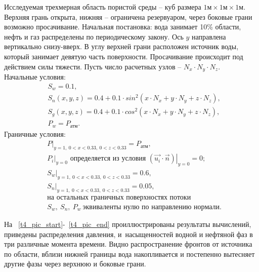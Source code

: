 Исследуемая трехмерная область пористой среды -- куб размера
$\text{1м} \times \text{1м} \times \text{1м}$.
Верхняя грань открыта, нижняя -- ограничена резервуаром, через боковые грани
возможно просачивание.
Начальная постановка: вода занимает 10\% области,
нефть и газ распределены по периодическому закону. Ось $y$ направлена вертикально снизу-вверх.
В углу верхней грани расположен источник воды, который занимает девятую часть поверхности. Просачивание происходит под действием силы тяжести. 
Пусть число расчетных узлов -- $N_x\cdot N_y\cdot N_z$.\\
Начальные условия:
\begin{equation}
  \begin{aligned}
    &S_w=0.1,\\
    &S_n(x, y, z)=0.4 + 0.1 \cdot sin^2(x \cdot N_x + y \cdot N_y + z \cdot N_z),\\
    &S_g(x, y, z)=0.4 + 0.1 \cdot cos^2(x \cdot N_x + y \cdot N_y + z \cdot N_z),\\
    &P_w=P_\text{атм}.
   \end{aligned}
\end{equation}
Граничные условия:
\begin{equation}
  \begin{aligned}
    &\left.P\right|_{y=1,\ 0 < x < 0.33,\ 0 < z < 0.33}=P_{\text{атм}},\\
    &\left.{P_i}\right|_{y=0}\text{ определяется из условия } \left.(\overrightarrow{u_i} \cdot \overrightarrow{n})\right|_{y=0}=0;\\
    &\left.S_w\right|_{y=1,\ 0 < x < 0.33,\ 0 < z < 0.33}=0.6,\\
    &\left.S_n\right|_{y=1,\ 0 < x < 0.33,\ 0 < z < 0.33}=0.05,\\
    &\text{на остальных граничных поверхностях потоки}\\
    &S_w,\ S_n,\ P_w\ \text{эквиваленты нулю по направлению нормали.}
  \end{aligned}
\end{equation}

На ~\ref{t4_pic_start}-~\ref{t4_pic_end} проиллюстрированы результаты вычислений, приведены распределения давления,
и~насыщенностей водной и нефтяной фаз в три различные момента времени. Видно распространение фронтов от источника по области, вблизи нижней границы вода накопливается и постепенно вытесняет другие фазы через верхнюю и боковые грани.

